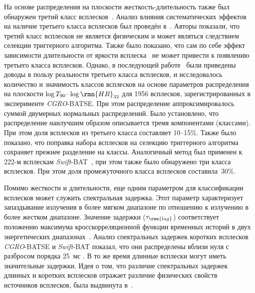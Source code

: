 На основе распределения на плоскости жесткость-длительность также был обнаружен 
третий класс всплесков~\citep{Mukherjee_1998, Hakkila_2000}. Анализ влияния 
систематических эффектов на наличие третьего класса всплесков был проведён 
в~\citep{Hakkila_2003}. Авторы показали, что третий класс всплесков не является 
физическим и может являться следствием селекции триггерного алгоритма. Также было 
показано, что сам по себе эффект зависимости длительности от яркости 
всплеска~\citep{Bonnell_1997} не может привести к появлению третьего класса всплесков. 
Однако, в последующей работе~\citep{Horvath_2006} были приведены доводы в пользу 
реальности третьего класса всплесков, и исследовалось количество и значимость 
классов всплесков на основе параметров распределения на плоскости 
$\log T_{90}\textrm{--}\log \rmn{HR}_{32}$ для 1956 всплесков, зарегистрированных 
в эксперименте \textit{CGRO}-BATSE. При этом распределение аппроксимировалось 
суммой двумерных нормальных распределений. Было установлено, что распределение 
наилучшим образом описывается тремя компонентами (классами). При этом доля всплесков 
из третьего класса составляет 10--15\%. Также было показано, что поправка набора 
всплесков на селекцию триггерного алгоритма сохраняет прежнее разделение на классы. 
Аналогичный метод был применен к 222-м всплескам \textit{Swift}-BAT~\citep{Horvath_2010}, 
при этом также было обнаружено три класса всплесков. При этом доля промежуточного 
класса всплесков составила~30\%.

Помимо жесткости и длительности, еще одним параметром для классификации всплесков 
может служить спектральная задержка. Этот параметр характеризует запаздывание 
излучения в более мягком диапазоне по отношению к излучению в более жестком диапазоне. 
Значение задержки ($\tau_{\rmn{lag}}$) соответствует положению  максимума 
кросскорреляционной функции временных историй в двух энергетических диапазонах~\citep{Norris_2000}. 
Анализ спектральных задержек коротких всплесков \textit{CGRO}-BATSE и 
\textit{Swift}-BAT показал, что они распределены вблизи нуля с разбросом 
порядка 25~мс \citep{Norris_and_Bonnel_2006, Norris2011}. В то же время длинные 
всплески могут иметь значительные задержки. Идея о том, что различие спектральных 
задержек длинных и коротких всплесков отражает различие физических свойств источников 
всплесков, была выдвинута в~\citep{Gehrels_2006_Nature}.


